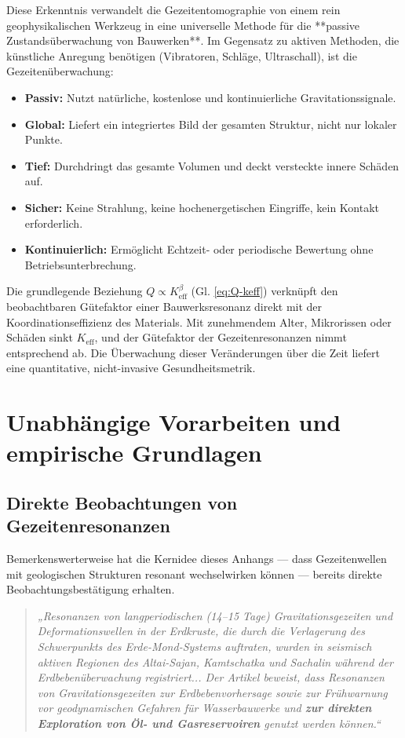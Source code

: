 \documentclass[12pt,a4paper]{article}
\theoremstyle{remark}
\begin{document}
	Diese Erkenntnis verwandelt die Gezeitentomographie von einem rein geophysikalischen Werkzeug in eine universelle Methode für die **passive Zustandsüberwachung von Bauwerken**. Im Gegensatz zu aktiven Methoden, die künstliche Anregung benötigen (Vibratoren, Schläge, Ultraschall), ist die Gezeitenüberwachung:
	\begin{itemize}
		\item \textbf{Passiv:} Nutzt natürliche, kostenlose und kontinuierliche Gravitationssignale.
		\item \textbf{Global:} Liefert ein integriertes Bild der gesamten Struktur, nicht nur lokaler Punkte.
		\item \textbf{Tief:} Durchdringt das gesamte Volumen und deckt versteckte innere Schäden auf.
		\item \textbf{Sicher:} Keine Strahlung, keine hochenergetischen Eingriffe, kein Kontakt erforderlich.
		\item \textbf{Kontinuierlich:} Ermöglicht Echtzeit- oder periodische Bewertung ohne Betriebsunterbrechung.
	\end{itemize}
	
	Die grundlegende Beziehung \(Q \propto K_{\mathrm{eff}}^{\beta}\) (Gl. \ref{eq:Q-keff}) verknüpft den beobachtbaren Gütefaktor einer Bauwerksresonanz direkt mit der Koordinationseffizienz des Materials. Mit zunehmendem Alter, Mikrorissen oder Schäden sinkt \(K_{\mathrm{eff}}\), und der Gütefaktor der Gezeitenresonanzen nimmt entsprechend ab. Die Überwachung dieser Veränderungen über die Zeit liefert eine quantitative, nicht-invasive Gesundheitsmetrik.
	
	\section{Unabhängige Vorarbeiten und empirische Grundlagen}
	\label{sec:prior}
	
	\subsection{Direkte Beobachtungen von Gezeitenresonanzen}
	
	Bemerkenswerterweise hat die Kernidee dieses Anhangs — dass Gezeitenwellen mit geologischen Strukturen resonant wechselwirken können — bereits direkte Beobachtungsbestätigung erhalten.
	
	\begin{quotation}
		\noindent
		\textit{„Resonanzen von langperiodischen (14–15 Tage) Gravitationsgezeiten und Deformationswellen in der Erdkruste, die durch die Verlagerung des Schwerpunkts des Erde-Mond-Systems auftraten, wurden in seismisch aktiven Regionen des Altai-Sajan, Kamtschatka und Sachalin während der Erdbebenüberwachung registriert... Der Artikel beweist, dass Resonanzen von Gravitationsgezeiten zur Erdbebenvorhersage sowie zur Frühwarnung vor geodynamischen Gefahren für Wasserbauwerke und \textbf{zur direkten Exploration von Öl- und Gasreservoiren} genutzt werden können.“} \cite{Sibgatulin2014}
	\end{quotation}
	
\end{document}
